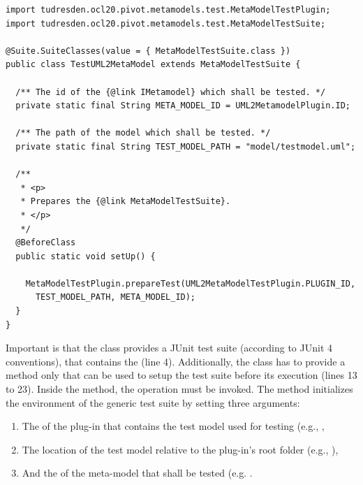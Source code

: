 \lstset{
  language=Java
}
\begin{lstlisting}[caption={An instantiation of the generic meta-model test suite.}, captionpos=b, label=list:metaModelTestSuite:constraints01, float]
import tudresden.ocl20.pivot.metamodels.test.MetaModelTestPlugin;
import tudresden.ocl20.pivot.metamodels.test.MetaModelTestSuite;

@Suite.SuiteClasses(value = { MetaModelTestSuite.class })
public class TestUML2MetaModel extends MetaModelTestSuite {

  /** The id of the {@link IMetamodel} which shall be tested. */
  private static final String META_MODEL_ID = UML2MetamodelPlugin.ID;

  /** The path of the model which shall be tested. */
  private static final String TEST_MODEL_PATH = "model/testmodel.uml";

  /**
   * <p>
   * Prepares the {@link MetaModelTestSuite}.
   * </p>
   */
  @BeforeClass
  public static void setUp() {

    MetaModelTestPlugin.prepareTest(UML2MetaModelTestPlugin.PLUGIN_ID, 
      TEST_MODEL_PATH, META_MODEL_ID);
  }
}
\end{lstlisting}

Important is that the class provides a JUnit test suite (according to JUnit 4
conventions), that contains the  (line 4).
Additionally, the class has to provide a  method only that can be 
used to setup the test suite before its execution (lines 13 to 23). Inside the 
 method, the operation
 must be invoked. 
The method initializes the environment of the generic test suite by setting 
three arguments:

\begin{enumerate}
	\item The  of the plug-in that contains the test model used for 
	  testing (e.g.,
	  ,
	\item The location of the test model relative to the plug-in's root folder 
	  (e.g., ),
	\item And the  of the meta-model that shall be tested (e.g. 
	  .
\end{enumerate}

